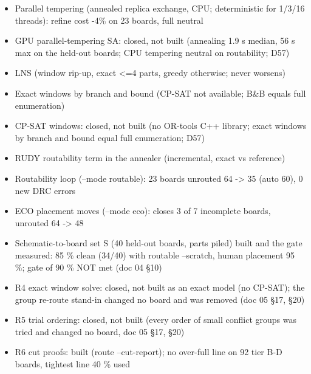 \begin{itemize}[leftmargin=1.6em,itemsep=1pt]
\item[\textcolor{fraqua}{$\checkmark$}] Parallel tempering (annealed replica exchange, CPU; deterministic for 1/3/16 threads): refine cost -4\% on 23 boards, full neutral
\item[\textcolor{fraqua}{$\checkmark$}] GPU parallel-tempering SA: closed, not built (annealing 1.9 s median, 56 s max on the held-out boards; CPU tempering neutral on routability; D57)
\item[\textcolor{fraqua}{$\checkmark$}] LNS (window rip-up, exact \textless{}=4 parts, greedy otherwise; never worsens)
\item[\textcolor{fraqua}{$\checkmark$}] Exact windows by branch and bound (CP-SAT not available; B\&B equals full enumeration)
\item[\textcolor{fraqua}{$\checkmark$}] CP-SAT windows: closed, not built (no OR-tools C++ library; exact windows by branch and bound equal full enumeration; D57)
\item[\textcolor{fraqua}{$\checkmark$}] RUDY routability term in the annealer (incremental, exact vs reference)
\item[\textcolor{fraqua}{$\checkmark$}] Routability loop (--mode routable): 23 boards unrouted 64 -\textgreater{} 35 (auto 60), 0 new DRC errors
\item[\textcolor{fraqua}{$\checkmark$}] ECO placement moves (--mode eco): closes 3 of 7 incomplete boards, unrouted 64 -\textgreater{} 48
\item[\textcolor{fraqua}{$\checkmark$}] Schematic-to-board set S (40 held-out boards, parts piled) built and the gate measured: 85 \% clean (34/40) with routable --scratch, human placement 95 \%; gate of 90 \% NOT met (doc 04 \S10)
\item[\textcolor{fraqua}{$\checkmark$}] R4 exact window solve: closed, not built as an exact model (no CP-SAT); the group re-route stand-in changed no board and was removed (doc 05 \S17, \S20)
\item[\textcolor{fraqua}{$\checkmark$}] R5 trial ordering: closed, not built (every order of small conflict groups was tried and changed no board, doc 05 \S17, \S20)
\item[\textcolor{fraqua}{$\checkmark$}] R6 cut proofs: built (route --cut-report); no over-full line on 92 tier B-D boards, tightest line 40 \% used
\end{itemize}
